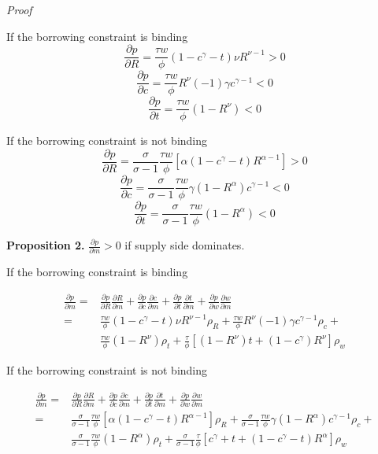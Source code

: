 \documentclass[12pt]{article}
\begin{document}
\textit{Proof }

If the borrowing constraint is binding
$$
\frac{\partial p}{\partial R}=\frac{\tau w}{\phi}(1-c^\gamma-t)\nu R^{\nu-1}>0
$$
$$
\frac{\partial p}{\partial c}=\frac{\tau w}{\phi} R^\nu(-1)\gamma c^{\gamma-1}<0
$$
$$
\frac{\partial p}{\partial t}=\frac{\tau w}{\phi}(1-R^\nu)<0
$$

If the borrowing constraint is not binding
$$
\frac{\partial p}{\partial R}=\frac{\sigma}{\sigma-1}\frac{\tau w}{\phi}[\alpha(1-c^\gamma-t)R^{\alpha-1}]>0
$$
$$
\frac{\partial p}{\partial c}=\frac{\sigma}{\sigma-1}\frac{\tau w}{\phi}\gamma(1-R^\alpha)c^{\gamma-1}<0
$$
$$
\frac{\partial p}{\partial t}=\frac{\sigma}{\sigma-1}\frac{\tau w}{\phi} (1-R^\alpha)<0
$$


\textbf{Proposition 2.} $\frac{\partial p}{\partial m}>0$ if supply side dominates.

If the borrowing constraint is binding

\begin{align*} 
\frac{\partial p}{\partial m} =&\frac{\partial p}{\partial R}\frac{\partial R}{\partial m}+\frac{\partial p}{\partial c}\frac{\partial c}{\partial m}+\frac{\partial p}{\partial t}\frac{\partial t}{\partial m}+\frac{\partial p}{\partial w}\frac{\partial w}{\partial m}  \\
=& \frac{\tau w}{\phi}(1-c^\gamma-t)\nu R^{\nu-1} \rho_R+ \frac{\tau w}{\phi} R^\nu(-1)\gamma c^{\gamma-1} \rho_c +\\  
& \frac{\tau w}{\phi}(1-R^\nu) \rho_t+\frac{\tau}{\phi}[(1-R^\nu)t+(1-c^\gamma)R^\nu] \rho_w
\end{align*} 

If the borrowing constraint is not binding

\begin{align*} 
\frac{\partial p}{\partial m} =&\frac{\partial p}{\partial R}\frac{\partial R}{\partial m}+\frac{\partial p}{\partial c}\frac{\partial c}{\partial m}+\frac{\partial p}{\partial t}\frac{\partial t}{\partial m}+\frac{\partial p}{\partial w}\frac{\partial w}{\partial m}  \\
=& \frac{\sigma}{\sigma-1}\frac{\tau w}{\phi}[\alpha(1-c^\gamma-t)R^{\alpha-1}] \rho_R + \frac{\sigma}{\sigma-1}\frac{\tau w}{\phi}\gamma(1-R^\alpha)c^{\gamma-1} \rho_c + \\
& \frac{\sigma}{\sigma-1}\frac{\tau w}{\phi} (1-R^\alpha) \rho_t + \frac{\sigma}{\sigma-1}\frac{\tau}{\phi}[c^\gamma+t+(1-c^\gamma-t)R^\alpha] \rho_w
\end{align*} 
\end{document}
